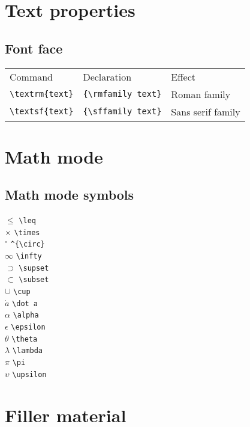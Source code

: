 \section{Text properties}

\subsection{Font face}

\begin{tabular}{lll}
Command & Declaration & Effect \\
\lstinline|\textrm{text}| & \lstinline|{\rmfamily text}| & \textrm{Roman family} \\
\lstinline|\textsf{text}| & \lstinline|{\sffamily text}| & \textsf{Sans serif family} \\
\end{tabular}


\section{Math mode}

\subsection{Math mode symbols}
\begin{multicols*}{4}
\( \leq \) \verb|\leq| \\
\( \times \) \verb|\times| \\
\( ^{\circ} \) \verb|^{\circ}| \\
\( \infty \) \verb|\infty| \\
\( \supset \) \verb|\supset| \\
\( \subset \) \verb|\subset| \\
\( \cup \) \verb|\cup| \\
\( \dot a \) \verb|\dot a| \\
\( \alpha \) \verb|\alpha| \\
\( \epsilon \) \verb|\epsilon| \\
\( \theta \) \verb|\theta| \\
\( \lambda \) \verb|\lambda| \\
\( \pi \) \verb|\pi| \\
\( \upsilon \) \verb|\upsilon|
\end{multicols*}

\section{Filler material}

\lipsum
